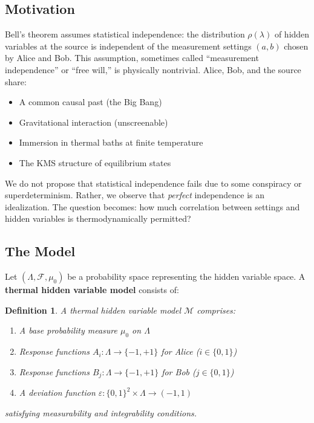 \documentclass[12pt,a4paper]{article}
\newtheorem{definition}[theorem]{Definition}
\newcommand{\eps}{\varepsilon}
\begin{document}
\subsection{Motivation}

Bell's theorem assumes statistical independence: the distribution $\rho(\lambda)$ of hidden variables at the source is independent of the measurement settings $(a, b)$ chosen by Alice and Bob. This assumption, sometimes called ``measurement independence'' or ``free will,'' is physically nontrivial. Alice, Bob, and the source share:
\begin{itemize}
\item A common causal past (the Big Bang)
\item Gravitational interaction (unscreenable)
\item Immersion in thermal baths at finite temperature
\item The KMS structure of equilibrium states
\end{itemize}

We do not propose that statistical independence fails due to some conspiracy or superdeterminism. Rather, we observe that \emph{perfect} independence is an idealization. The question becomes: how much correlation between settings and hidden variables is thermodynamically permitted?

\subsection{The Model}

Let $(\Lambda, \mathcal{F}, \mu_0)$ be a probability space representing the hidden variable space. A \textbf{thermal hidden variable model} consists of:

\begin{definition}
A thermal hidden variable model $\mathcal{M}$ comprises:
\begin{enumerate}
\item A base probability measure $\mu_0$ on $\Lambda$
\item Response functions $A_i : \Lambda \to \{-1, +1\}$ for Alice ($i \in \{0,1\}$)
\item Response functions $B_j : \Lambda \to \{-1, +1\}$ for Bob ($j \in \{0,1\}$)
\item A deviation function $\eps : \{0,1\}^2 \times \Lambda \to (-1, 1)$
\end{enumerate}
satisfying measurability and integrability conditions.
\end{definition}
\end{document}

